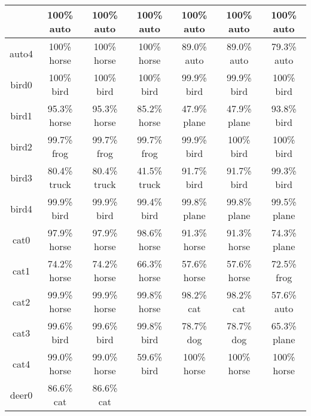 \begin{longtable}{| c | c | c | c | c | c | c |}
& 100\% auto\cellcolor{green}		
& 100\% auto\cellcolor{green} 	
& 100\% auto\cellcolor{green} 	
&  100\% auto\cellcolor{green}  	
& 100\% auto\cellcolor{green} 	
& 100\% auto\cellcolor{green}\\
 \hline
auto4\cellcolor{light-gray} 	
& 100\% horse		
& 100\% horse 	
& 100\% horse 	
&  89.0\% auto\cellcolor{green}  	
& 89.0\% auto\cellcolor{green} 	
& 79.3\% auto\cellcolor{green}\\
 \hline
bird0 	\cellcolor{light-gray}	
& 100\% bird\cellcolor{green}		
& 100\% bird\cellcolor{green} 	
& 100\% bird\cellcolor{green} 	
& 99.9\% bird\cellcolor{green}  	
& 99.9\% bird\cellcolor{green} 	
& 100\% bird\cellcolor{green}\\
 \hline
bird1 	\cellcolor{light-gray}	
& 95.3\% horse		
& 95.3\% horse 	
& 85.2\% horse 	
& 47.9\% plane
& 47.9\% plane
& 93.8\% bird\cellcolor{green}\\
 \hline
bird2 	\cellcolor{light-gray}	
& 99.7\% frog		
& 99.7\% frog 	
& 99.7\% frog 	
&  99.9\% bird\cellcolor{green} 	 
& 100\% bird\cellcolor{green} 	
& 100\% bird\cellcolor{green}\\
 \hline
bird3 	\cellcolor{light-gray}	
& 80.4\% truck		
& 80.4\% truck 	
& 41.5\% truck 	
&  91.7\% bird\cellcolor{green} 	 
& 91.7\% bird\cellcolor{green} 	
& 99.3\% bird\cellcolor{green}\\
 \hline
bird4 	\cellcolor{light-gray}	
& 99.9\% bird\cellcolor{green}		
& 99.9\% bird\cellcolor{green} 	
& 99.4\% bird\cellcolor{green} 	
&  99.8\% plane
& 99.8\% plane 
& 99.5\% plane\\
 \hline
cat0 	\cellcolor{light-gray}	
& 97.9\% horse		
& 97.9\% horse 	
& 98.6\% horse 	
&  91.3\% horse  
& 91.3\% horse 
& 74.3\% plane\\
 \hline
cat1 	\cellcolor{light-gray}	
& 74.2\% horse		
& 74.2\% horse 	
& 66.3\% horse 	
&  57.6\% horse	 
& 57.6\% horse 
& 72.5\% frog\\
 \hline
cat2 	\cellcolor{light-gray}	
& 99.9\% horse		
& 99.9\% horse 	
& 99.8\% horse 
&  98.2\% cat\cellcolor{green} 	 
& 98.2\% cat\cellcolor{green} 	
& 57.6\% auto\\
 \hline
cat3 	\cellcolor{light-gray}	
& 99.6\% bird		
& 99.6\% bird 	
& 99.8\% bird 	
& 78.7\% dog 	
 & 78.7\% dog 	
 & 65.3\% plane\\
 \hline
cat4 	\cellcolor{light-gray}	
& 99.0\% horse		
& 99.0\% horse 	
& 59.6\% bird 	
& 100\% horse 	
 & 100\% horse 	
 & 100\% horse\\
 \hline
deer0\cellcolor{light-gray} 	
& 86.6\% cat 		
& 86.6\% cat 	

\end{longtable}
